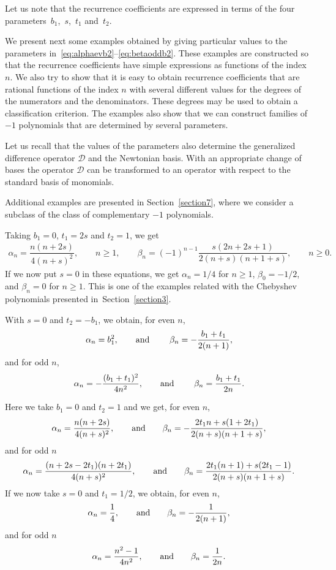 \documentclass[pdftex]{sigma}
\def\cD{\mathcal D}
\numberwithin{equation}{section}
\begin{document}
Let us note that the recurrence coefficients are expressed in terms of the four parameters~$b_1$,~$s$,~$t_1$ and~$t_2$.

We present next some examples obtained by giving particular values to the parameters in~\eqref{eq:alphaevb2}--\eqref{eq:betaoddb2}.
These examples are constructed so that the recurrence coefficients have simple expressions as functions of the index $n$. We also try to show that it is easy to obtain recurrence coefficients that are rational functions of the index $n$ with several different values for the degrees of the numerators and the denominators. These degrees may be used to obtain a classification criterion. The examples also show that we can construct families of $-1$ polynomials that are determined by several parameters.

Let us recall that the values of the parameters also determine the generalized difference operator $\cD$ and the Newtonian basis. With an appropriate change of bases the operator $\cD$ can be transformed to an operator with respect to the standard basis of monomials.

Additional examples are presented in Section~\ref{section7}, where we consider a subclass of the class of complementary $-1$ polynomials.

\begin{Example}
Taking $b_1=0$, $t_1=2s$ and $t_2=1$, we get
\begin{gather*}%
\alpha_n=\dfrac{n(n+2s)}{4 (n+s)^2}, \qquad n\ge 1,
\qquad
	\beta_n=(-1)^{n-1}\dfrac{s(2 n + 2s+1)}{2 (n+s)(n+1+s)}, \qquad n\ge 0.
\end{gather*}
If we now put $s=0$ in these equations, we get $\alpha_n=1/4$ for $n\ge 1$, $\beta_0=-1/2$, and $\beta_n=0$ for $n\ge 1$. This is one of the examples related with the Chebyshev polynomials presented in~Section~\ref{section3}.
\end{Example}
\begin{Example}
With $s=0$ and $t_2=-b_1$, we obtain, for even $n$,
\[ \alpha_n=b_1^2, \qquad \hbox{and }\qquad \beta_n= -\dfrac{b_1+t_1}{2 (n+1)}, \]
and for odd $n$,
\[ \alpha_n=-\dfrac{(b_1+t_1)^2}{4 n^2}, \qquad \hbox{and } \qquad \beta_n=\dfrac{b_1+t_1}{2 n}. \]
\end{Example}
\begin{Example}
Here we take $b_1=0$ and $t_2=1$ and we get, for even $n$,
\[ \alpha_n=\dfrac{n ( n+2s)}{4(n+s)^2}, \qquad \hbox{and} \qquad \beta_n=-\dfrac{2 t_1 n + s(1+ 2 t_1)}{2(n+s)(n+1+s)}, \]
and for odd $n$
\[ \alpha_n=\dfrac{(n+2s-2t_1)(n+ 2 t_1)}{4(n+s)^2}, \qquad \hbox{and} \qquad \beta_n=
\dfrac{2 t_1( n+1) + s( 2 t_1-1)}{2(n+s)(n+1+s)}. \]
If we now take $s=0$ and $t_1=1/2$, we obtain, for even $n$,
\[ \alpha_n=\frac{1}{4}, \qquad \hbox{and} \qquad \beta_n=-\dfrac{1}{2 (n+1)}, \]
and for odd $n$
\[ \alpha_n=\dfrac{n^2-1}{4 n^2}, \qquad \hbox{and} \qquad \beta_n=\dfrac{1}{2 n}. \]
\end{Example}
\end{document}
